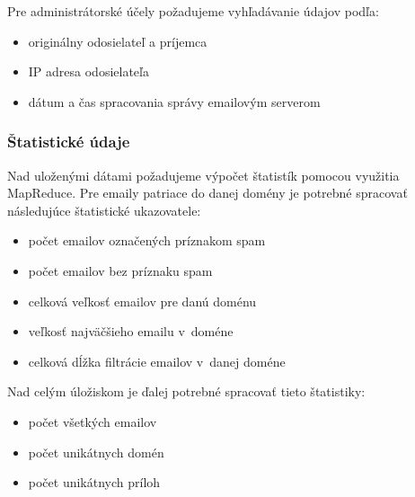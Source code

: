 \documentclass[11pt,twoside,a4paper]{book}
\begin{document}
\newpage
\noindent
Pre administrátorské účely požadujeme vyhľadávanie údajov podľa: %
\begin{itemize}
 \item originálny odosielateľ a príjemca
 \item IP adresa odosielateľa
 \item dátum a čas spracovania správy emailovým serverom
\end{itemize}


\subsubsection*{Štatistické údaje}
Nad uloženými dátami požadujeme výpočet štatistík pomocou využitia MapReduce. Pre emaily patriace do danej domény je potrebné spracovať následujúce štatistické ukazovatele:

\begin{itemize}
  \item
  počet emailov označených príznakom spam
  \item
  počet emailov bez príznaku spam
  \item
  celková veľkosť emailov pre danú doménu
  \item
  veľkosť najväčšieho emailu v~doméne
  \item 
  celková dĺžka filtrácie emailov v~danej doméne %
\end{itemize}
\noindent
Nad celým úložiskom je ďalej potrebné spracovať tieto štatistiky:
\begin{itemize}
  \item
  počet všetkých emailov
  \item 
  počet unikátnych domén
  \item
  počet unikátnych príloh
\end{itemize}


\end{document}
